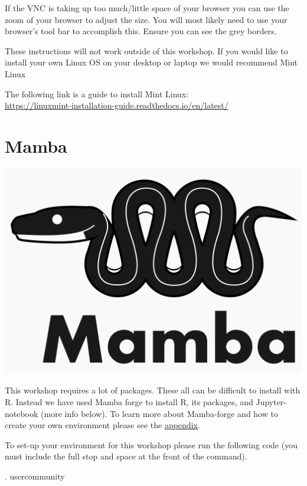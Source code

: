 \documentclass[
]{book}
\newenvironment{Shaded}{\begin{snugshade}}{\end{snugshade}}
\newcommand{\BuiltInTok}[1]{#1}
\newcommand{\NormalTok}[1]{#1}
\begin{document}
If the VNC is taking up too much/little space of your browser you can use the zoom of your browser to adjust the size.
You will most likely need to use your browser's tool bar to accomplish this.
Ensure you can see the grey borders.

These instructions will not work outside of this workshop.
If you would like to install your own Linux OS on your desktop or laptop we would recommend Mint Linux

The following link is a guide to install Mint Linux:\\
\url{https://linuxmint-installation-guide.readthedocs.io/en/latest/}

\hypertarget{mamba}{%
\section{Mamba}\label{mamba}}

\includegraphics{figures/mamba_logo.png}

This workshop requires a lot of packages.
These all can be difficult to install with R.
Instead we have used Mamba forge to install R, its packages, and Jupyter-notebook (more info below).
To learn more about Mamba-forge and how to create your own environment please see the \protect\hyperlink{mamba_install}{appendix}.

To set-up your environment for this workshop please run the following code (you must include the full stop and space at the front of the command).

\begin{Shaded}
\begin{Highlighting}[]
\BuiltInTok{.}\NormalTok{ usercommunity}
\end{Highlighting}
\end{Shaded}
\end{document}
